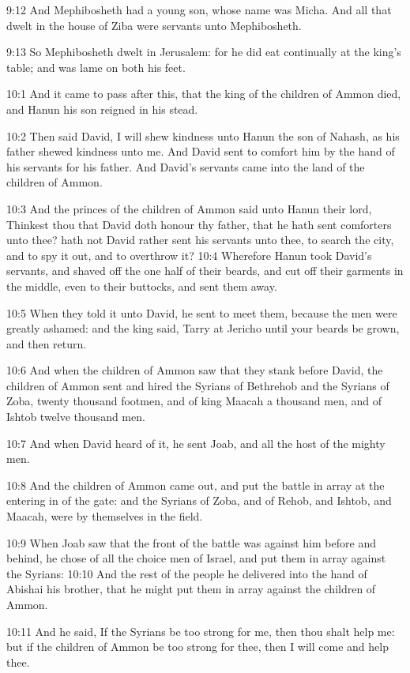 9:12 And Mephibosheth had a young son, whose name was Micha. And all
that dwelt in the house of Ziba were servants unto Mephibosheth.

9:13 So Mephibosheth dwelt in Jerusalem: for he did eat continually at
the king's table; and was lame on both his feet.

10:1 And it came to pass after this, that the king of the children of
Ammon died, and Hanun his son reigned in his stead.

10:2 Then said David, I will shew kindness unto Hanun the son of
Nahash, as his father shewed kindness unto me. And David sent to
comfort him by the hand of his servants for his father. And David's
servants came into the land of the children of Ammon.

10:3 And the princes of the children of Ammon said unto Hanun their
lord, Thinkest thou that David doth honour thy father, that he hath
sent comforters unto thee? hath not David rather sent his servants
unto thee, to search the city, and to spy it out, and to overthrow it?
10:4 Wherefore Hanun took David's servants, and shaved off the one
half of their beards, and cut off their garments in the middle, even
to their buttocks, and sent them away.

10:5 When they told it unto David, he sent to meet them, because the
men were greatly ashamed: and the king said, Tarry at Jericho until
your beards be grown, and then return.

10:6 And when the children of Ammon saw that they stank before David,
the children of Ammon sent and hired the Syrians of Bethrehob and the
Syrians of Zoba, twenty thousand footmen, and of king Maacah a
thousand men, and of Ishtob twelve thousand men.

10:7 And when David heard of it, he sent Joab, and all the host of the
mighty men.

10:8 And the children of Ammon came out, and put the battle in array
at the entering in of the gate: and the Syrians of Zoba, and of Rehob,
and Ishtob, and Maacah, were by themselves in the field.

10:9 When Joab saw that the front of the battle was against him before
and behind, he chose of all the choice men of Israel, and put them in
array against the Syrians: 10:10 And the rest of the people he
delivered into the hand of Abishai his brother, that he might put them
in array against the children of Ammon.

10:11 And he said, If the Syrians be too strong for me, then thou
shalt help me: but if the children of Ammon be too strong for thee,
then I will come and help thee.

